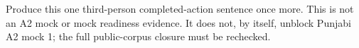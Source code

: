 \begin{tcolorbox}[breakable,colback=teal!4,colframe=teal!35!black,title={Before you move on}]
Produce this one third-person completed-action sentence once more. This is not an A2 mock or mock readiness evidence. It does not, by itself, unblock Punjabi A2 mock 1; the full public-corpus closure must be rechecked.
\end{tcolorbox}

